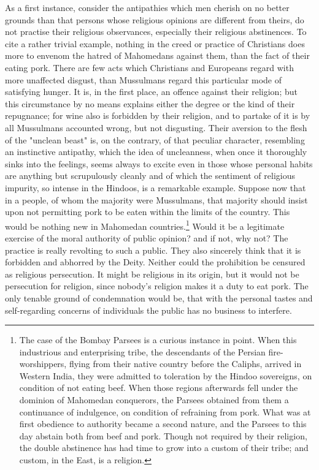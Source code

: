 \documentclass[12pt]{report}
\begin{document}
As a first instance, consider the antipathies which men cherish on no better grounds than that persons whose religious opinions are different from theirs, do not practise their religious observances, especially their religious abstinences. To cite a rather trivial example, nothing in the creed or practice of Christians does more to envenom the hatred of Mahomedans against them, than the fact of their eating pork. There are few acts which Christians and Europeans regard with more unaffected disgust, than Mussulmans regard this particular mode of satisfying hunger. It is, in the first place, an offence against their religion; but this circumstance by no means explains either the degree or the kind of their repugnance; for wine also is forbidden by their religion, and to partake of it is by all Mussulmans accounted wrong, but not disgusting. Their aversion to the flesh of the "unclean beast" is, on the contrary, of that peculiar character, resembling an instinctive antipathy, which the idea of uncleanness, when once it thoroughly sinks into the feelings, seems always to excite even in those whose personal habits are anything but scrupulously cleanly and of which the sentiment of religious impurity, so intense in the Hindoos, is a remarkable example. Suppose now that in a people, of whom the majority were Mussulmans, that majority should insist upon not permitting pork to be eaten within the limits of the country. This would be nothing new in Mahomedan countries.\footnote{The case of the Bombay Parsees is a curious instance in point. When this industrious and enterprising tribe, the descendants of the Persian fire-worshippers, flying from their native country before the Caliphs, arrived in Western India, they were admitted to toleration by the Hindoo sovereigns, on condition of not eating beef. When those regions afterwards fell under the dominion of Mahomedan conquerors, the Parsees obtained from them a continuance of indulgence, on condition of refraining from pork. What was at first obedience to authority became a second nature, and the Parsees to this day abstain both from beef and pork. Though not required by their religion, the double abstinence has had time to grow into a custom of their tribe; and custom, in the East, is a religion.} Would it be a legitimate exercise of the moral authority of public opinion? and if not, why not? The practice is really revolting to such a public. They also sincerely think that it is forbidden and abhorred by the Deity. Neither could the prohibition be censured as religious persecution. It might be religious in its origin, but it would not be persecution for religion, since nobody's religion makes it a duty to eat pork. The only tenable ground of condemnation would be, that with the personal tastes and self-regarding concerns of individuals the public has no business to interfere.
\end{document}
